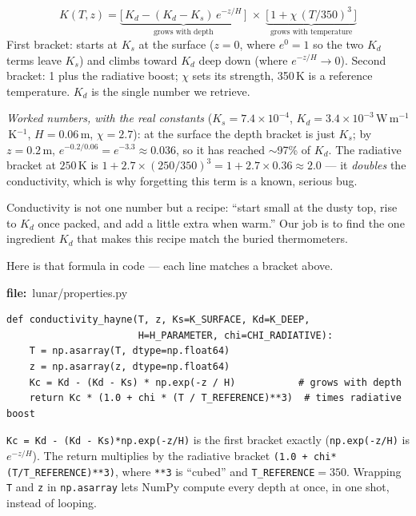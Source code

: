 \documentclass[11pt]{article}
\newcommand{\codefile}[1]{\par\smallskip\noindent
  {\footnotesize\ttfamily\color{teal!55!black}\textbf{file:}~#1}\par\nopagebreak}
\renewcommand{\codefile}[1]{\par\smallskip\noindent
    {\footnotesize\ttfamily\color{black}\textbf{file:}~#1}\par\nopagebreak}
\begin{document}
\begin{mathbox}
\[
K(T,z) = \underbrace{\big[\,K_d - (K_d-K_s)\,e^{-z/H}\,\big]}_{\text{grows with depth}}
\;\times\;
\underbrace{\big[\,1 + \chi\,(T/350)^3\,\big]}_{\text{grows with temperature}}
\]
First bracket: starts at $K_s$ at the surface ($z=0$, where $e^{0}=1$ so
the two $K_d$ terms leave $K_s$) and climbs toward $K_d$ deep down (where
$e^{-z/H}\to0$). Second bracket: 1 plus the radiative boost; $\chi$ sets
its strength, 350\,K is a reference temperature. $K_d$ is the single
number we retrieve.
\end{mathbox}

\emph{Worked numbers, with the real constants}
($K_s=7.4\times10^{-4}$, $K_d=3.4\times10^{-3}$\,W\,m$^{-1}$\,K$^{-1}$,
$H=0.06\,$m, $\chi=2.7$): at the surface the depth bracket is just $K_s$;
by $z=0.2\,$m, $e^{-0.2/0.06}=e^{-3.3}\approx0.036$, so it has reached
$\sim$97\% of $K_d$. The radiative bracket at $250\,$K is
$1+2.7\times(250/350)^3 = 1+2.7\times0.36 \approx 2.0$ --- it
\emph{doubles} the conductivity, which is why forgetting this term is a
known, serious bug.

\begin{plainbox}
Conductivity is not one number but a recipe: ``start small at the dusty
top, rise to $K_d$ once packed, and add a little extra when warm.'' Our
job is to find the one ingredient $K_d$ that makes this recipe match the
buried thermometers.
\end{plainbox}

Here is that formula in code --- each line matches a bracket above.
\codefile{lunar/properties.py}
\begin{lstlisting}
def conductivity_hayne(T, z, Ks=K_SURFACE, Kd=K_DEEP,
                       H=H_PARAMETER, chi=CHI_RADIATIVE):
    T = np.asarray(T, dtype=np.float64)
    z = np.asarray(z, dtype=np.float64)
    Kc = Kd - (Kd - Ks) * np.exp(-z / H)           # grows with depth
    return Kc * (1.0 + chi * (T / T_REFERENCE)**3)  # times radiative boost
\end{lstlisting}
\begin{codebox}
\texttt{Kc = Kd - (Kd - Ks)*np.exp(-z/H)} is the first bracket exactly
(\texttt{np.exp(-z/H)} is $e^{-z/H}$). The return multiplies by the
radiative bracket \texttt{(1.0 + chi*(T/T\_REFERENCE)**3)}, where
\texttt{**3} is ``cubed'' and \texttt{T\_REFERENCE}$=350$. Wrapping
\texttt{T} and \texttt{z} in \texttt{np.asarray} lets NumPy compute every
depth at once, in one shot, instead of looping.
\end{codebox}
\end{document}
